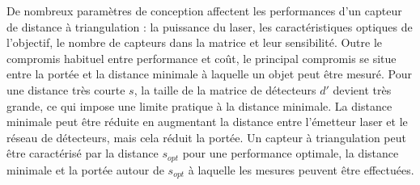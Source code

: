 De nombreux paramètres de conception affectent les performances d'un capteur de distance à triangulation : la puissance du laser, les caractéristiques optiques de l'objectif, le nombre de capteurs dans la matrice et leur sensibilité. Outre le compromis habituel entre performance et coût, le principal compromis se situe entre la portée et la distance minimale à laquelle un objet peut être mesuré. Pour une distance très courte $s$, la taille de la matrice de détecteurs $d'$ devient très grande, ce qui impose une limite pratique à la distance minimale. La distance minimale peut être réduite en augmentant la distance entre l'émetteur laser et le réseau de détecteurs, mais cela réduit la portée. Un capteur à triangulation peut être caractérisé par la distance $s_{\textit{opt}}$ pour une performance optimale, la distance minimale et la portée autour de $s_{\textit{opt}}$ à laquelle les mesures peuvent être effectuées.


